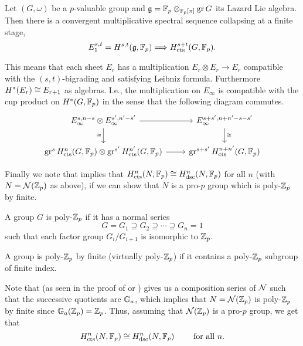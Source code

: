 \begin{theorem}\label{thm:spec-seq}
  Let $(G,\omega)$ be a $p$-valuable group and $\mathfrak{g} = \mathbb{F}_{p} \otimes_{\mathbb{F}_{p}[\pi]} \operatorname{gr} G$ its Lazard Lie algebra. Then there is a convergent multiplicative spectral sequence collapsing at a finite stage,
  \[
    E_1^{s,t} = H^{s,t}(\mathfrak{g},\mathbb{F}_{p}) \Longrightarrow H_{\mathrm{cts}}^{s+t}(G,\mathbb{F}_{p}).
  \]

  This means that each sheet $E_{r}$ has a multiplication $E_{r} \otimes E_{r} \to E_{r}$ compatible with the $(s,t)$-bigrading and satisfying Leibniz formula. Furthermore $H^{*}(E_{r}) \cong E_{r+1}$ as algebras. I.e., the multiplication on $E_\infty$ is compatible with the cup product on $H^{*}(G,\mathbb{F}_{p})$ in the sense that the following diagram commutes.
  \[
    \begin{tikzcd}
      E_\infty^{s,n-s} \otimes E_\infty^{s',n'-s'} \ar[r] \ar[d,swap,"\iso"] & E_\infty^{s+s',n+n'-s-s'} \ar[d,"\iso"] \\
      \gr^s \Hc^n(G,\F_{p}) \otimes \gr^{s'} \Hc^{n'}(G,\F_{p}) \ar[r] & \gr^{s+s'}\Hc^{n+n'}(G,\F_{p})
    \end{tikzcd}
  \]
\end{theorem}

\begin{remark}
  Finally we note that \cite[Thm.~2.10]{CohComp} implies that $H_{\mathrm{cts}}^{n}(N,\mathbb{F}_{p}) \cong H_{\mathrm{dsc}}^{n}(N,\mathbb{F}_{p})$ for all $n$ (with $N = \mathcal{N}(\mathbb{Z}_{p})$ as above), if we can show that $N$ is a pro-$p$ group which is poly-$\mathbb{Z}_{p}$ by finite.
  \begin{definition}
    A group $G$ is poly-$\mathbb{Z}_{p}$ if it has a normal series
    \begin{equation*}
      G = G_{1} \supseteq G_{2} \supseteq \cdots  \supseteq G_{n} = 1
    \end{equation*}
    such that each factor group $G_{i}/G_{i+1}$ is isomorphic to $\mathbb{Z}_{p}$.

    A group is poly-$\mathbb{Z}_{p}$ by finite (virtually poly-$\mathbb{Z}_{p}$) if it contains a poly-$\mathbb{Z}_{p}$ subgroup of finite index.
  \end{definition}
  Note that \cite[Prop.~5.1.16(2) and Cor.~5.2.5]{Con-book} (as seen in the proof of \cite[Cor.~5.2.13]{Con-book} or \cite[Thm.~5.4.3]{Con-book}) gives us a composition series of $\mathcal{N}$ such that the successive quotients are $\mathbb{G}_{a}$, which implies that $N = \mathcal{N}(\mathbb{Z}_{p})$ is poly-$\mathbb{Z}_{p}$ by finite since $\mathbb{G}_{a}(\mathbb{Z}_{p}) = \mathbb{Z}_{p}$. Thus, assuming that $\mathcal{N}(\mathbb{Z}_{p})$ is a pro-$p$ group, we get that
  \begin{equation}
    \label{eq:coh-comp}
    H_{\mathrm{cts}}^{n}(N,\mathbb{F}_{p}) \cong H_{\mathrm{dsc}}^{n}(N,\mathbb{F}_{p}) \qquad \text{ for all } n.
  \end{equation}
\end{remark}

